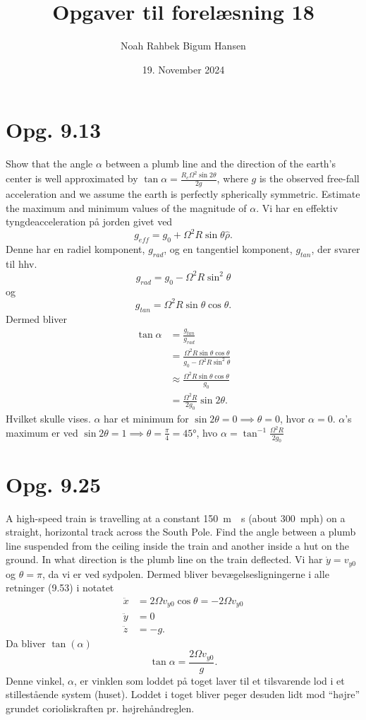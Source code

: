 \documentclass[12pt]{article}
\title{Opgaver til forelæsning 18}
\author{Noah Rahbek Bigum Hansen}
\date{19. November 2024}
\theoremstyle{definition}
\begin{document}
\maketitle

\section*{Opg. 9.13}
Show that the angle $\alpha$ between a plumb line and the direction of the earth's center is well approximated by $\tan \alpha = \frac{R_c \Omega^2 \sin 2\theta}{2g}$, where $g$ is the observed free-fall acceleration and we assume the earth is perfectly spherically symmetric. Estimate the maximum and minimum values of the magnitude of $\alpha$.
\bigbreak
Vi har en effektiv tyngdeacceleration på jorden givet ved
\[ 
g_{eff} = g_0 + \Omega^2R \sin \theta \hat{\rho}
.\]
Denne har en radiel komponent, $g_{rad}$, og en tangentiel komponent, $g_{tan}$, der svarer til hhv.
\[ 
g_{rad} = g_0 - \Omega^2R \sin^2 \theta
\]
og
\[ 
g_{tan} = \Omega^2 R \sin \theta \cos \theta
.\]
Dermed bliver
\begin{align*}
  \tan \alpha &= \frac{g_{tan}}{g_{rad}} \\
  &= \frac{\Omega^2 R \sin \theta \cos \theta}{g_0 - \Omega^2 R \sin^2 \theta} \\
  &\approx \frac{\Omega^2 R \sin \theta \cos\theta}{g_0} \\
  &= \frac{\Omega^2 R}{2g_0} \sin 2\theta
.\end{align*}
Hvilket skulle vises. $\alpha$ har et minimum for $\sin 2\theta = 0 \implies\theta = 0$, hvor $\alpha = 0$. $\alpha$'s maximum er ved $\sin 2 \theta = 1 \implies \theta  = \frac{\pi}{4} = \ang{45}$, hvo $\alpha = \tan^{-1} \frac{\Omega^2 R}{2g_0}$


\section*{Opg. 9.25}
A high-speed train is travelling at a constant \qty{150}{m \per s} (about \qty{300}{mph}) on a straight, horizontal track across the South Pole. Find the angle between a plumb line suspended from the ceiling inside the train and another inside a hut on the ground. In what direction is the plumb line on the train deflected.
\bigbreak
Vi har $\dot{y} = v_{y0}$ og $\theta = \pi$, da vi er ved sydpolen. Dermed bliver bevægelsesligningerne i alle retninger (9.53) i notatet
\begin{align*}
  \ddot{x} &= 2\Omega v_{y0} \cos \theta = -2\Omega v_{y0}\\
  \ddot{y} &= 0 \\
  \ddot{z} &= -g
.\end{align*}
Da bliver $\tan(\alpha)$
\[ 
\tan \alpha = \frac{2\Omega v_{y0}}{g}
.\]
Denne vinkel, $\alpha$, er vinklen som loddet på toget laver til et tilsvarende lod i et stillestående system (huset). Loddet i toget bliver peger desuden lidt mod ``højre'' grundet corioliskraften pr. højrehåndreglen.
\end{document}
